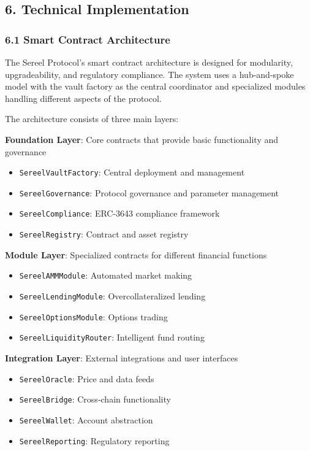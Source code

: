 \documentclass[12pt]{article}
\begin{document}
{{{\subsection{6. Technical Implementation} %

\subsubsection{6.1 Smart Contract Architecture} %

The Sereel Protocol's smart contract architecture is designed for modularity, upgradeability, and regulatory compliance. The system uses a hub-and-spoke model with the vault factory as the central coordinator and specialized modules handling different aspects of the protocol.


The architecture consists of three main layers:

\textbf{Foundation Layer}: Core contracts that provide basic functionality and governance
\begin{itemize}
	\item \lstinline{SereelVaultFactory}: Central deployment and management
	\item \lstinline{SereelGovernance}: Protocol governance and parameter management
	\item \lstinline{SereelCompliance}: ERC-3643 compliance framework
	\item \lstinline{SereelRegistry}: Contract and asset registry

\end{itemize}
\textbf{Module Layer}: Specialized contracts for different financial functions
\begin{itemize}
	\item \lstinline{SereelAMMModule}: Automated market making
	\item \lstinline{SereelLendingModule}: Overcollateralized lending
	\item \lstinline{SereelOptionsModule}: Options trading
	\item \lstinline{SereelLiquidityRouter}: Intelligent fund routing

\end{itemize}
\textbf{Integration Layer}: External integrations and user interfaces
\begin{itemize}
	\item \lstinline{SereelOracle}: Price and data feeds
	\item \lstinline{SereelBridge}: Cross-chain functionality
	\item \lstinline{SereelWallet}: Account abstraction
	\item \lstinline{SereelReporting}: Regulatory reporting


\end{itemize}}}}
\end{document}
